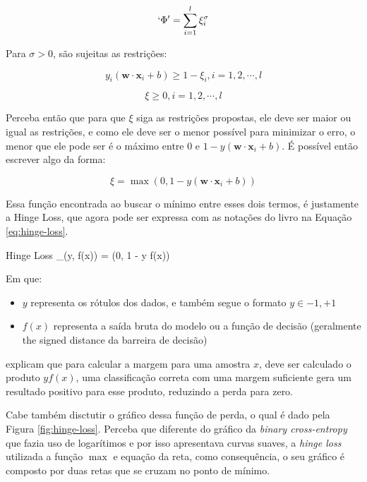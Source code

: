 \[
    `\Phi ' = \sum_{i = 1}^l \xi_i^{\sigma}
\]

Para $\sigma > 0$, são sujeitas as restrições:

\[
    y_i (\textbf{w} \cdot \textbf{x}_i + b) \ge 1 - \xi_i, i = 1, 2, \cdots, l
\]

\[
    \xi \ge 0, i = 1, 2, \cdots, l
\]

Perceba então que para que $\xi$ siga as restrições propostas, ele deve ser maior ou igual as restrições, e como ele deve ser o menor possível para minimizar o erro, o menor que ele pode ser é o máximo entre 0 e $1 - y(\textbf{w} \cdot \textbf{x}_i + b)$. É possível então escrever algo da forma:

\[
    \xi = \max (0, 1 - y(\textbf{w} \cdot \textbf{x}_i + b))
\]

Essa função encontrada ao buscar o mínimo entre esses dois termos, é justamente a Hinge Loss, que agora pode ser expressa com as notações do livro na Equação \ref{eq:hinge-loss}.

\begin{equacaodestaque}{Hinge Loss}
    \Loss_{}(y, f(x)) = \max(0, 1 - y \cdot f(x))
    \label{eq:hinge-loss}
\end{equacaodestaque}

Em que:

\begin{itemize}
    \item $y$ representa os rótulos dos dados, e também segue o formato $y \in {-1, +1}$
    \item $f(x)$ representa a saída bruta do modelo ou a função de decisão (geralmente the signed distance da barreira de decisão)
\end{itemize}

\textcite{LossesArticle} explicam que para calcular a margem para uma amostra $x$, deve ser calculado o produto $yf(x)$, uma classificação correta com uma margem suficiente gera um resultado positivo para esse produto, reduzindo a perda para zero.

Cabe também disctutir o gráfico dessa função de perda, o qual é dado pela Figura \ref{fig:hinge-loss}. Perceba que diferente do gráfico da \textit{binary cross-entropy} que fazia uso de logarítimos e por isso apresentava curvas suaves, a \textit{hinge loss} utilizada a função $\max$ e equação da reta, como consequência, o seu gráfico é composto por duas retas que se cruzam no ponto de mínimo.

